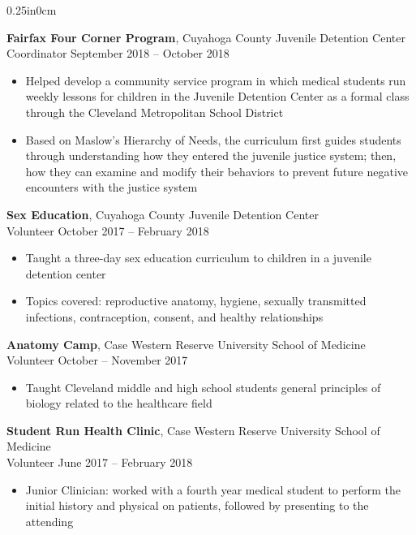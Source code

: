 \documentclass[11pt]{article}
\newcommand{\blockindent}{0.25in}
\newcommand{\job}[4]{
\textbf{#1}, {#2} \\
{#3} \hfill {#4}\\
}
\begin{document}
\begin{adjustwidth}{\blockindent}{0cm}
\job{Fairfax Four Corner Program}{Cuyahoga County Juvenile Detention Center}{Coordinator}{September 2018 -- October 2018}
\begin{itemize}

	\item Helped develop a community service program in which medical students run weekly lessons for children in the Juvenile Detention Center as a formal class through the Cleveland Metropolitan School District

	\item Based on Maslow's Hierarchy of Needs, the curriculum first guides students through understanding how they entered the juvenile justice system; then, how they can examine and modify their behaviors to prevent future negative encounters with the justice system

\end{itemize}

\job{Sex Education}{Cuyahoga County Juvenile Detention Center}{Volunteer}{October 2017 -- February 2018}
\begin{itemize}

	\item Taught a three-day sex education curriculum to children in a juvenile detention center

	\item Topics covered: reproductive anatomy, hygiene, sexually transmitted infections, contraception, consent, and healthy relationships

\end{itemize}

\job{Anatomy Camp}{Case Western Reserve University School of Medicine}{Volunteer}{October -- November 2017}
\begin{itemize}

	\item Taught Cleveland middle and high school students general principles of biology related to the healthcare field

\end{itemize}

\job{Student Run Health Clinic}{Case Western Reserve University School of Medicine}{Volunteer}{June 2017 -- February 2018}
\begin{itemize}

	\item Junior Clinician: worked with a fourth year medical student to perform the initial history and physical on patients, followed by presenting to the attending


\end{itemize}
\end{adjustwidth}
\end{document}
